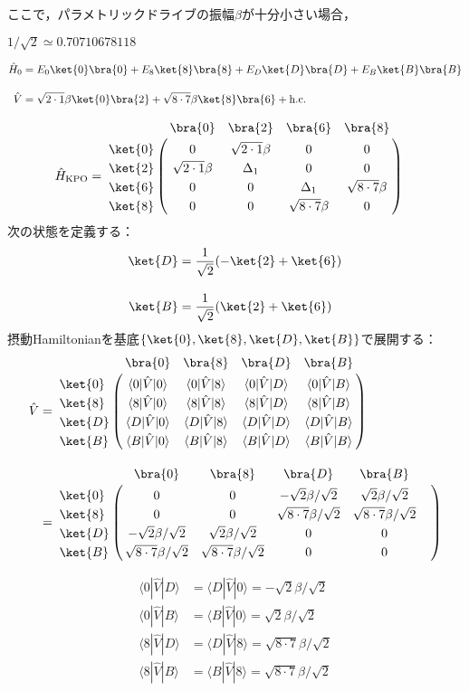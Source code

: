ここで，パラメトリックドライブの振幅$\beta$が十分小さい場合，

$1/\sqrt{2} \simeq 0.70710678118$

\begin{align}
    \hat{H}_0 &= E_{0}\ket{0}\bra{0} + E_8 \ket{8}\bra{8} + E_{D} \ket{D}\bra{D}+ E_{B} \ket{B}\bra{B}\\[10pt]
    \hat{V}&= \sqrt{2\cdot1}\beta\ket{0}\bra{2} + \sqrt{8\cdot7}\beta\ket{8}\bra{6} + {\rm{h.c.}}
\end{align}


\begin{align}
     \hat{H}_{\rm{KPO}}
    &=
   \bordermatrix{     
    & \bra{0} &  \bra{2} &  \bra{6}&  \bra{8}\cr
   \ket{0}&0&\sqrt{2\cdot1}\beta&0&0\cr
  \ket{2}&\sqrt{2\cdot1}\beta&\Delta_1&0&0\cr
  \ket{6}&0&0&\Delta_1&\sqrt{8\cdot7}\beta\cr
  \ket{8}&0&0&\sqrt{8\cdot7}\beta&0\cr
            }
\end{align}
次の状態を定義する：
\begin{align}
    \ket{D} &= \frac{1}{\sqrt{2}}(-\ket{2}+\ket{6})\\[10pt]
    \ket{B} &= \frac{1}{\sqrt{2}}(\ket{2}+\ket{6})
\end{align}
摂動Hamiltonianを基底$\{\ket{0},\ket{8},\ket{D},\ket{B}\}$で展開する：
\begin{align}
     \hat{V}
    &=
   \bordermatrix{     
    & \bra{0} &  \bra{8} &  \bra{D}&  \bra{B}\cr
   \ket{0}&\langle{0|\hat{V}|0}\rangle&\langle{0|\hat{V}|8}\rangle&\langle{0|\hat{V}|D}\rangle
   &\langle{0|\hat{V}|B}\rangle\cr
  \ket{8}&\langle{8|\hat{V}|0}\rangle&\langle{8|\hat{V}|8}\rangle&\langle{8|\hat{V}|D}\rangle
   &\langle{8|\hat{V}|B}\rangle\cr
  \ket{D}&\langle{D|\hat{V}|0}\rangle&\langle{D|\hat{V}|8}\rangle&\langle{D|\hat{V}|D}\rangle
   &\langle{D|\hat{V}|B}\rangle\cr
  \ket{B}&\langle{B|\hat{V}|0}\rangle&\langle{B|\hat{V}|8}\rangle&\langle{B|\hat{V}|D}\rangle
   &\langle{B|\hat{V}|B}\rangle\cr
    }\\[10pt]
    &=
   \bordermatrix{     
    & \bra{0} &  \bra{8} &  \bra{D}&  \bra{B}\cr
   \ket{0}&0&0&-\sqrt{2}\beta/\sqrt{2}&\sqrt{2}\beta/\sqrt{2}\cr
  \ket{8}&0&0&\sqrt{8\cdot7}\beta/\sqrt{2}&\sqrt{8\cdot7}\beta/\sqrt{2}\cr
  \ket{D}&-\sqrt{2}\beta/\sqrt{2}&\sqrt{2}\beta/\sqrt{2}&0&0\cr
  \ket{B}&\sqrt{8\cdot7}\beta/\sqrt{2}&\sqrt{8\cdot7}\beta/\sqrt{2}&0&0&\cr
            }
\end{align}

\begin{align}
    \langle{0|\hat{V}|D}\rangle&=\langle{D|\hat{V}|0}\rangle=-\sqrt{2}\beta/\sqrt{2}\\[10pt]
    \langle{0|\hat{V}|B}\rangle&=\langle{B|\hat{V}|0}\rangle=\sqrt{2}\beta/\sqrt{2}\\[10pt]
    \langle{8|\hat{V}|D}\rangle&=\langle{D|\hat{V}|8}\rangle=\sqrt{8\cdot7}\beta/\sqrt{2}\\[10pt]
   \langle{8|\hat{V}|B}\rangle&=\langle{B|\hat{V}|8}\rangle=\sqrt{8\cdot7}\beta/\sqrt{2}
\end{align}


